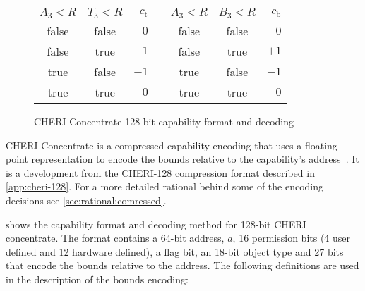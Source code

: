 \begin{figure}
\begin{center}
\begin{tabular}{@{}ccr@{}p{1em}@{}ccr@{}}
\cmidrule[\heavyrulewidth]{1-3}\cmidrule[\heavyrulewidth]{5-7}
$A_3<R$ & $T_3<R$ & $c_\text{t}$&&$A_3<R$ & $B_3<R$ & $c_\text{b}$\\
\cmidrule{1-3}\cmidrule{5-7}
false & false & $0$  &&false & false & $0$  \\
false & true  & $+1$ &&false & true  & $+1$ \\
true  & false & $-1$ &&true  & false & $-1$ \\
true  & true  & $0$  &&true  & true  & $0$  \\
\cmidrule[\heavyrulewidth]{1-3}\cmidrule[\heavyrulewidth]{5-7}
\end{tabular}
\end{center}
\caption{CHERI Concentrate 128-bit capability format and decoding}
\label{fig:cheric128}
\vspace{-1.5em}
\end{figure}

CHERI Concentrate is a compressed capability encoding that uses a floating point
representation to encode the bounds relative to the capability's address~\cite{Woodruff2019}.
It is a development from the CHERI-128 compression format described in \cref{app:cheri-128}.
For a more detailed rational behind some of the encoding decisions see \cref{sec:rational:comressed}.

 shows the capability format and decoding method for 128-bit CHERI concentrate.
The format contains a 64-bit address, $a$, 16 permission bits (4 user defined and 12 hardware defined), a flag bit, an 18-bit object type and 27 bits that encode the bounds relative to the address.
The following definitions are used in the description of the bounds encoding:

